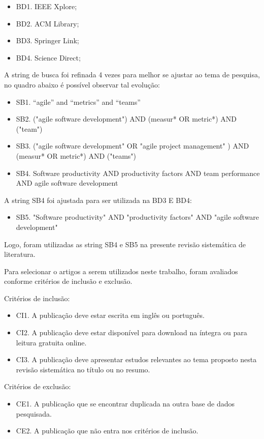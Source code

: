 \begin{itemize}
  \item BD1. IEEE Xplore;
  \item BD2. ACM Library;
  \item BD3. Springer Link;
  \item BD4. Science Direct;
\end{itemize}

A string de busca foi refinada 4 vezes para melhor se ajustar ao tema de
pesquisa, no quadro abaixo é possível observar tal evolução:

\begin{itemize}
  \item SB1. “agile” and “metrics” and “teams”
  \item SB2. ("agile software development") AND (measur* OR metric*) AND ("team")
  \item SB3. ("agile software development" OR "agile project management" )
  AND (measur* OR metric*) AND ("teams")
  \item SB4. Software productivity AND productivity factors AND team performance
  AND agile software development \\
\end{itemize}

A string SB4 foi ajustada para ser utilizada na BD3 E BD4:
\begin{itemize}
  \item SB5. "Software productivity" AND "productivity factors" AND "agile
  software development"
\end{itemize}

Logo, foram utilizadas as string SB4 e SB5 na presente revisão sistemática de
literatura.

Para selecionar o artigos a serem utilizados neste trabalho, foram avaliados
conforme critérios de inclusão e exclusão.

Critérios de inclusão:
\begin{itemize}
  \item CI1. A publicação deve estar escrita em inglês ou português.
  \item CI2. A publicação deve estar disponível para download na íntegra ou para
  leitura gratuita online.
  \item CI3. A publicação deve apresentar estudos relevantes ao tema proposto
  nesta revisão sistemática no título ou no resumo.
\end{itemize}

Critérios de exclusão:
\begin{itemize}
  \item CE1. A publicação que se encontrar duplicada na outra base de dados
  pesquisada.
  \item CE2. A publicação que não entra nos critérios de inclusão.
\end{itemize}


